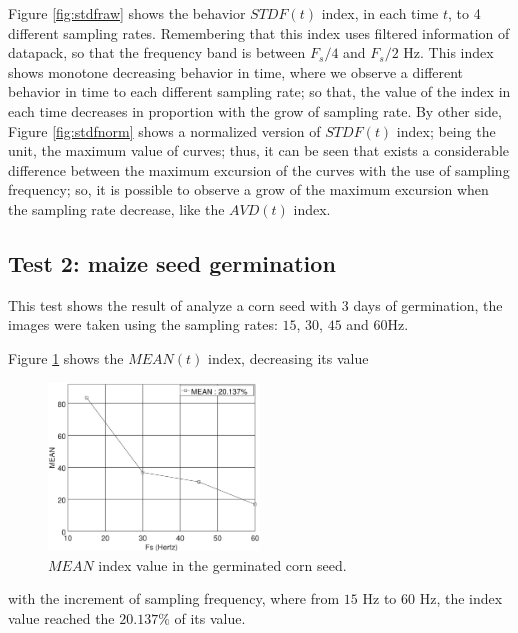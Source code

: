 \documentclass[review]{elsarticle}
\begin{document}
Figure \ref{fig:stdfraw} shows the behavior $STDF(t)$ index, in each time $t$, 
to 4 different sampling rates. Remembering that this index uses filtered 
information of datapack, so that the frequency
band is between $F_s/4$ and $F_s/2$ Hz. 
This index shows monotone decreasing behavior in time, where we observe 
a different behavior in time to each different sampling rate;
so that, the value of the index in each time decreases in proportion with 
the grow of sampling rate. By other side,
Figure \ref{fig:stdfnorm} shows a normalized version of $STDF(t)$ index;
being the unit, the maximum value of curves; thus,
it can be seen that exists a considerable difference between the maximum excursion 
of the curves with the use of sampling frequency; so, it is possible to observe a 
grow of the maximum excursion when the sampling rate decrease, like the $AVD(t)$ index.

\subsection{Test 2: maize seed germination}
\label{subsec:resulttest2}

This test shows the result of analyze a corn seed  with 3 days of germination,
the images were taken using the sampling rates: $15$, $30$, $45$ and $60$Hz.

Figure \ref{fig:MEANtest2} shows the $MEAN(t)$ index,
decreasing its value
\begin{figure}[ht!]
    \centering
    \includegraphics[width=0.5\textwidth]{FPS_Semilla_3_3diasALLMEAN.eps}
    \caption{$MEAN$ index value in the germinated corn seed.}\label{fig:MEANtest2}
\end{figure}
with the increment of sampling frequency, %
where from %
$15$ Hz to $60$ Hz, the index value reached the $20.137\%$ of its value.
\end{document}
